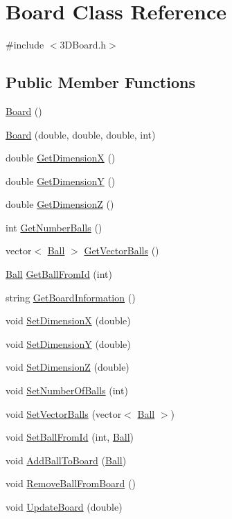 \hypertarget{classBoard}{\section{Board Class Reference}
\label{classBoard}
}


{\ttfamily \#include $<$3\+D\+Board.\+h$>$}

\subsection*{Public Member Functions}
\begin{DoxyCompactItemize}
\item 
\hyperlink{classBoard_a9ee491d4fea680cf69b033374a9fdfcb}{Board} ()
\item 
\hyperlink{classBoard_af26e9eedabd3559a0a823594a9836a9c}{Board} (double, double, double, int)
\item 
double \hyperlink{classBoard_a6004dec19aa29da6fffee5ceec0a13ae}{Get\+Dimension\+X} ()
\item 
double \hyperlink{classBoard_a5d90ba60a138223ce0dc9679d50fbdb8}{Get\+Dimension\+Y} ()
\item 
double \hyperlink{classBoard_aff29d5fed09c4f613fd8f910e77125ff}{Get\+Dimension\+Z} ()
\item 
int \hyperlink{classBoard_a626fb9f489b8bdf89d08c6b49b3e7555}{Get\+Number\+Balls} ()
\item 
vector$<$ \hyperlink{classBall}{Ball} $>$ \hyperlink{classBoard_a3b6346e52d69e15ddba100248cfe4789}{Get\+Vector\+Balls} ()
\item 
\hyperlink{classBall}{Ball} \hyperlink{classBoard_ad7661f151aa307b5cf3c4a7aa809ced4}{Get\+Ball\+From\+Id} (int)
\item 
string \hyperlink{classBoard_a4963e139df9b877cdd57770e01d26d7a}{Get\+Board\+Information} ()
\item 
void \hyperlink{classBoard_a770d11a85df68916f931e457028be6eb}{Set\+Dimension\+X} (double)
\item 
void \hyperlink{classBoard_ac370e9c8e7abcdc0be8d9f4e0e5a3306}{Set\+Dimension\+Y} (double)
\item 
void \hyperlink{classBoard_a5fa6bd2aaf89395612d609aef15f3e0c}{Set\+Dimension\+Z} (double)
\item 
void \hyperlink{classBoard_abf2f2750ff34813b72a3b7642ad592d2}{Set\+Number\+Of\+Balls} (int)
\item 
void \hyperlink{classBoard_adc03b83ba8b8a268f5e5498f65f18e0d}{Set\+Vector\+Balls} (vector$<$ \hyperlink{classBall}{Ball} $>$)
\item 
void \hyperlink{classBoard_aef6af921107ced16387ae844eaee7cf6}{Set\+Ball\+From\+Id} (int, \hyperlink{classBall}{Ball})
\item 
void \hyperlink{classBoard_ae6bdd398db4c50fb6b6598aedb267dc4}{Add\+Ball\+To\+Board} (\hyperlink{classBall}{Ball})
\item 
void \hyperlink{classBoard_ac1e5115cbbf774b92c68c1dc1b1ffb45}{Remove\+Ball\+From\+Board} ()
\item 
void \hyperlink{classBoard_af19eeae45cb4bf01b8e65f5c242d151e}{Update\+Board} (double)
\end{DoxyCompactItemize}
